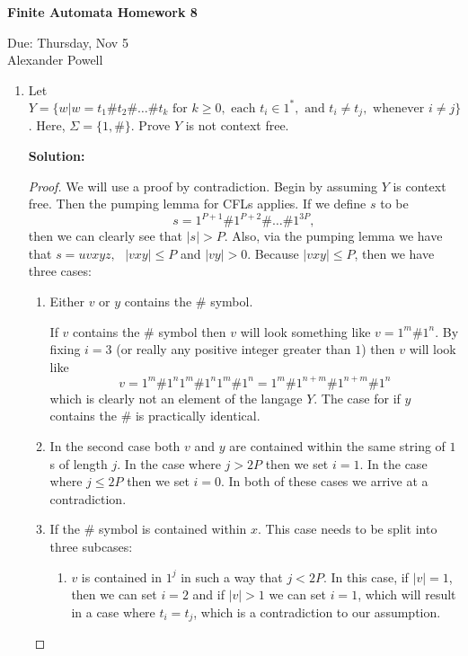 \documentclass[11pt]{article}
\begin{document}
\begin{center}             %
\begin{LARGE}
{\bf Finite Automata Homework 8}
\end{LARGE}
\vskip 0.25cm      %

Due: Thursday, Nov 5\\  %
Alexander Powell
\end{center}

\begin{enumerate}

\item
Let $Y = \{ w | w = t_1\#t_2\#\ldots\#t_k \text{ for }k \geq 0, \text{ each }t_i \in 1^*, 
\text{ and }t_i \neq t_j,\text{ whenever }i \neq j \}$.  Here, $\Sigma = \{ 1, \# \}$.  Prove $Y$ is not context free.  

\textbf{Solution: }
\begin{proof}
We will use a proof by contradiction.  Begin by assuming $Y$ is context free.  Then the pumping lemma for CFLs applies.  If we define $s$ to be 
$$ s = 1^{P+1} \# 1^{P+2}\#\ldots\#1^{3P}, $$
then we can clearly see that $|s| > P$.  Also, via the pumping lemma we have that $s = uvxyz,\text{ } |vxy| \leq P$ and $|vy| > 0$.  Because $|vxy| \leq P$, then we have three cases:
\begin{enumerate}
\item Either $v$ or $y$ contains the $\#$ symbol.  

If $v$ contains the $\#$ symbol then $v$ will look something like $v = 1^m \# 1^n$.  
By fixing $i=3$ (or really any positive integer greater than $1$) then $v$ will look like
$$ v = 1^m \# 1^n 1^m \# 1^n 1^m \# 1^n = 1^m \# 1^{n+m} \# 1^{n+m} \# 1^n $$
which is clearly not an element of the langage $Y$.  The case for if $y$ contains the $\#$ is practically identical.  

\item In the second case both $v$ and $y$ are contained within the same string of $1$s of length $j$.  In the case where $j > 2P$ then we set $i=1$.  In the case where $j \leq 2P$ then we set $i=0$.  In both of these cases we arrive at a contradiction.  

\item If the $\#$ symbol is contained within $x$.  This case needs to be split into three subcases:  
\begin{enumerate}
\item $v$ is contained in $1^j$ in such a way that $j < 2P$.  In this case, if $|v| = 1$, then we can set $i=2$ and if $|v| > 1$ we can set $i = 1$, which will result in a case where $t_i = t_j$, which is a contradiction to our assumption.  


\end{enumerate}
\end{enumerate}
\end{proof}
\end{enumerate}
\end{document}
